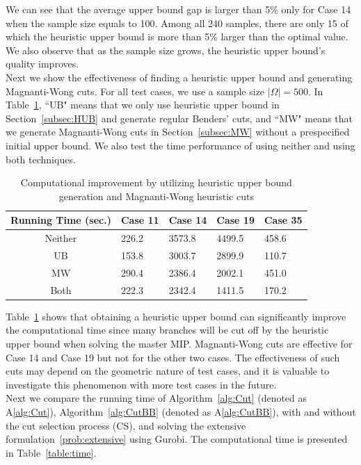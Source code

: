 \documentclass[11pt]{article}
\newcommand{\noi}{\noindent}
\begin{document}
	\noi We can see that the average upper bound gap is larger than 5\% only for Case 14 when the sample size equals to 100. Among all 240 samples, there are only 15 of which the heuristic upper bound is more than 5\% larger than the optimal value. We also observe that as the sample size grows, the heuristic upper bound's quality improves. \\
	\newline
	Next we show the effectiveness of finding a heuristic upper bound and generating Magnanti-Wong cuts. For all test cases, we use a sample size \(|\Omega| = 500\). In Table~\ref{table:heuristics}, ``UB" means that we only use heuristic upper bound in Section~\ref{subsec:HUB} and generate regular Benders' cuts, and ``MW" means that we generate Magnanti-Wong cuts in Section~\ref{subsec:MW} without a prespecified initial upper bound. We also test the time performance of using neither and using both techniques.
	\begin{table}[H]
		\centering		
		\begin{tabular}{ c | l l l l }
			\hline
			Running Time (sec.) & Case 11 & Case 14 & Case 19 & Case 35 \\ \hline
			Neither & 226.2 & 3573.8 & 4499.5 & 458.6 \\
			UB & 153.8 & 3003.7 & 2899.9 & 110.7\\
			MW & 290.4 & 2386.4 & 2002.1 & 451.0\\
			Both & 222.3 & 2342.4 & 1411.5 & 170.2\\
			\hline
		\end{tabular}
		\caption{Computational improvement by utilizing heuristic upper bound generation and Magnanti-Wong heuristic cuts}
		\label{table:heuristics}
	\end{table}
	Table~\ref{table:heuristics} shows that obtaining a heuristic upper bound can significantly improve the computational time since many branches will be cut off by the heuristic upper bound when solving the master MIP. Magnanti-Wong cuts are effective for Case 14 and Case 19 but not for the other two cases. The effectiveness of such cuts may depend on the geometric nature of test cases, and it is valuable to investigate this phenomenon with more test cases in the future.\\
	\newline
	\noi Next we compare the running time of Algorithm~\ref{alg:Cut} (denoted as A\ref{alg:Cut}), Algorithm~\ref{alg:CutBB} (denoted as A\ref{alg:CutBB}), with and without the cut selection process (CS), and solving the extensive formulation~\eqref{prob:extensive} using Gurobi. The computational time is presented in Table~\ref{table:time}.
\end{document}
